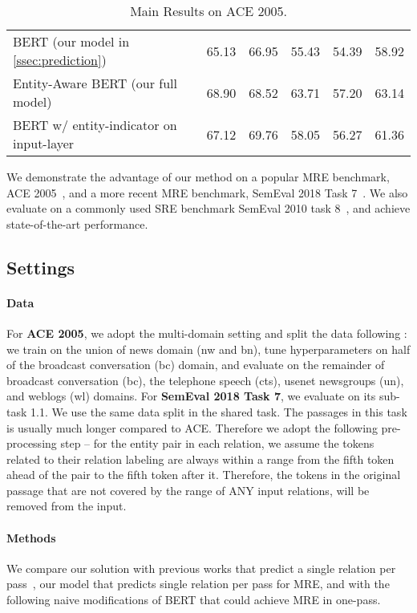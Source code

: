 \documentclass[11pt,a4paper]{article}
\begin{document}
\begin{table*}[!htbp]
\begin{tabular}{lccccc}
BERT (our model in \cref{ssec:prediction}) & 65.13 & 66.95 & 55.43 & 54.39 & 58.92 \\
Entity-Aware BERT (our full model)                                                    & 68.90        & 68.52          & {63.71} & 57.20          & 63.14          \\ 
BERT w/ entity-indicator on input-layer & 67.12        & 69.76          & 58.05          & 56.27          & 61.36          \\
\bottomrule
\end{tabular}
\vspace{-2mm}
\caption{Main Results on ACE 2005.}
\vspace{-2mm}
\label{tab:ace}
\end{table*}




We demonstrate the advantage of our method on a popular MRE benchmark, ACE 2005~\cite{walker2006ace}, and a more recent MRE benchmark, SemEval 2018 Task 7~\cite{gabor2018semeval}.
We also evaluate on a commonly used SRE benchmark SemEval 2010 task 8~\cite{hendrickx2009semeval}, and achieve state-of-the-art performance.
\subsection{Settings}

\paragraph{Data} For \textbf{ACE 2005}, we adopt the multi-domain setting and split the data following \cite{gormley2015improved}:
we train on the union of news domain (nw and bn), tune hyperparameters on half of the broadcast conversation (bc) domain, and evaluate on the remainder of broadcast conversation (bc), the telephone speech (cts), usenet newsgroups (un), and weblogs (wl) domains.
For \textbf{SemEval 2018 Task 7}, we evaluate on its sub-task 1.1.
We use the same data split in the shared task. 
The passages in this task is usually much longer compared to ACE. Therefore we adopt the following pre-processing step -- for the entity pair in each relation, we assume the tokens related to their relation labeling are always within a range from the fifth token ahead of the pair to the fifth token after it. Therefore, the tokens in the original passage that are not covered by the range of ANY input relations, will be removed from the input. 

\paragraph{Methods}
We compare our solution with previous works that predict a single relation per pass~\cite{gormley2015improved,nguyen2015combining,fu2017domain,shi2018genre}, our model that predicts single relation per pass for MRE, and with the following naive modifications of BERT that could achieve MRE in one-pass.
\end{document}
